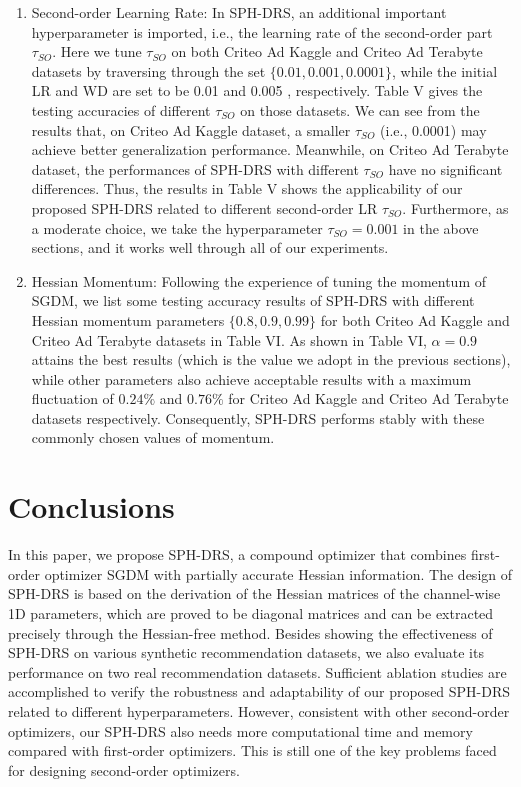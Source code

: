 \documentclass[conference]{IEEEtran}
\begin{document}
\begin{enumerate}
  \item Second-order Learning Rate: In SPH-DRS, an additional important hyperparameter is imported, i.e., the learning rate of the second-order part $\tau_{S O}$. Here we tune $\tau_{S O}$ on both Criteo Ad Kaggle and Criteo Ad Terabyte datasets by traversing through the set $\{0.01,0.001,0.0001\}$, while the initial LR and WD are set to be 0.01 and 0.005 , respectively. Table V gives the testing accuracies of different $\tau_{S O}$ on those datasets. We can see from the results that, on Criteo Ad Kaggle dataset, a smaller $\tau_{S O}$ (i.e., 0.0001) may achieve better generalization performance. Meanwhile, on Criteo Ad Terabyte dataset, the performances of SPH-DRS with different $\tau_{S O}$ have no significant differences. Thus, the results in Table V shows the applicability of our proposed SPH-DRS related to different second-order LR $\tau_{S O}$. Furthermore, as a moderate choice, we take the hyperparameter $\tau_{S O}=0.001$ in the above sections, and it works well through all of our experiments.
  \item Hessian Momentum: Following the experience of tuning the momentum of SGDM, we list some testing accuracy results of SPH-DRS with different Hessian momentum parameters $\{0.8,0.9,0.99\}$ for both Criteo Ad Kaggle and Criteo Ad Terabyte datasets in Table VI. As shown in Table VI, $\alpha=0.9$ attains the best results (which is the value we adopt in the previous sections), while other parameters also achieve acceptable results with a maximum fluctuation of $0.24 \%$ and $0.76 \%$ for Criteo Ad Kaggle and Criteo Ad Terabyte datasets respectively. Consequently, SPH-DRS performs stably with these commonly chosen values of momentum.
\end{enumerate}

\section{Conclusions}

In this paper, we propose SPH-DRS, a compound optimizer that combines first-order optimizer SGDM with partially accurate Hessian information. The design of SPH-DRS is based on the derivation of the Hessian matrices of the channel-wise 1D parameters, which are proved to be diagonal matrices and can be extracted precisely through the Hessian-free method. Besides showing the effectiveness of SPH-DRS on various synthetic recommendation datasets, we also evaluate its performance on two real recommendation datasets. Sufficient ablation studies are accomplished to verify the robustness and adaptability of our proposed SPH-DRS related to different hyperparameters. However, consistent with other second-order optimizers, our SPH-DRS also needs more computational time and memory compared with first-order optimizers. This is still one of the key problems faced for designing second-order optimizers.
\end{document}
